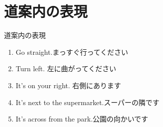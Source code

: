 \documentclass[aspectratio=169,xcolor={dvipsnames,table}]{beamer}
\begin{document}
\section{道案内の表現}
\begin{frame}[plain]{道案内の表現}
 \begin{enumerate}
  \item Go straight.まっすぐ行ってください
  \item Turn left. 左に曲がってください
  \item It's on your right. 右側にあります
  \item It's next to the supermarket.スーパーの隣です
  \item It's across from the park.公園の向かいです
 \end{enumerate}
\end{frame}
\end{document}
